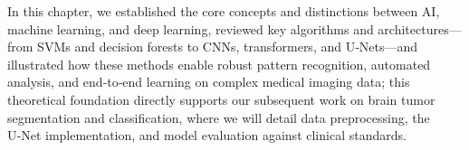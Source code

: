 In this chapter, we established the core concepts and distinctions between AI, machine learning, and deep learning, reviewed key algorithms and architectures—from SVMs and decision forests to CNNs, transformers, and U‑Nets—and illustrated how these methods enable robust pattern recognition, automated analysis, and end‑to‑end learning on complex medical imaging data; this theoretical foundation directly supports our subsequent work on brain tumor segmentation and classification, where we will detail data preprocessing, the U‑Net implementation, and model evaluation against clinical standards.
